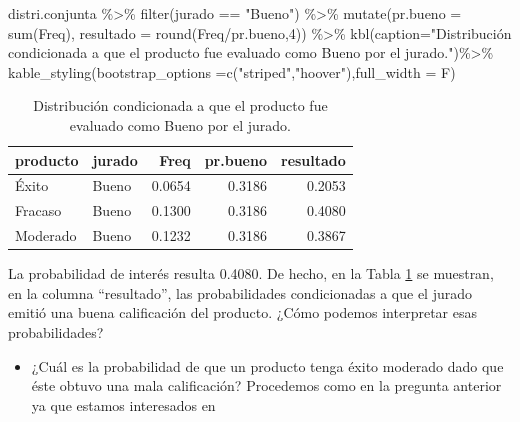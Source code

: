 \documentclass[
]{book}
\newenvironment{Shaded}{\begin{snugshade}}{\end{snugshade}}
\newcommand{\AttributeTok}[1]{\textcolor[rgb]{0.77,0.63,0.00}{#1}}
\newcommand{\DecValTok}[1]{\textcolor[rgb]{0.00,0.00,0.81}{#1}}
\newcommand{\FunctionTok}[1]{\textcolor[rgb]{0.00,0.00,0.00}{#1}}
\newcommand{\NormalTok}[1]{#1}
\newcommand{\SpecialCharTok}[1]{\textcolor[rgb]{0.00,0.00,0.00}{#1}}
\newcommand{\StringTok}[1]{\textcolor[rgb]{0.31,0.60,0.02}{#1}}
\providecommand{\tightlist}{%
  \setlength{\itemsep}{0pt}\setlength{\parskip}{0pt}}
\theoremstyle{definition}
\theoremstyle{definition}
\theoremstyle{definition}
\theoremstyle{definition}
\theoremstyle{remark}
\begin{document}
\begin{Shaded}
\begin{Highlighting}[]
\NormalTok{distri.conjunta }\SpecialCharTok{\%\textgreater{}\%} 
  \FunctionTok{filter}\NormalTok{(jurado }\SpecialCharTok{==} \StringTok{"Bueno"}\NormalTok{) }\SpecialCharTok{\%\textgreater{}\%}
  \FunctionTok{mutate}\NormalTok{(}\AttributeTok{pr.bueno =} \FunctionTok{sum}\NormalTok{(Freq), }\AttributeTok{resultado =} \FunctionTok{round}\NormalTok{(Freq}\SpecialCharTok{/}\NormalTok{pr.bueno,}\DecValTok{4}\NormalTok{)) }\SpecialCharTok{\%\textgreater{}\%}
  \FunctionTok{kbl}\NormalTok{(}\AttributeTok{caption=}\StringTok{"Distribución condicionada a que el producto fue evaluado como Bueno por el jurado."}\NormalTok{)}\SpecialCharTok{\%\textgreater{}\%}
      \FunctionTok{kable\_styling}\NormalTok{(}\AttributeTok{bootstrap\_options =}\FunctionTok{c}\NormalTok{(}\StringTok{"striped"}\NormalTok{,}\StringTok{"hoover"}\NormalTok{),}\AttributeTok{full\_width =}\NormalTok{ F)}
\end{Highlighting}
\end{Shaded}

\begin{table}

\caption{\label{tab:01-031}Distribución condicionada a que el producto fue evaluado como Bueno por el jurado.}
\centering
\begin{tabular}[t]{l|l|r|r|r}
\hline
producto & jurado & Freq & pr.bueno & resultado\\
\hline
Éxito & Bueno & 0.0654 & 0.3186 & 0.2053\\
\hline
Fracaso & Bueno & 0.1300 & 0.3186 & 0.4080\\
\hline
Moderado & Bueno & 0.1232 & 0.3186 & 0.3867\\
\hline
\end{tabular}
\end{table}

La probabilidad de interés resulta 0.4080. De hecho, en la Tabla \ref{tab:01-031} se muestran, en la columna ``resultado'', las probabilidades condicionadas a que el jurado emitió una buena calificación del producto. ¿Cómo podemos interpretar esas probabilidades?

\begin{itemize}
\tightlist
\item
  ¿Cuál es la probabilidad de que un producto tenga éxito moderado dado que éste obtuvo una mala calificación? Procedemos como en la pregunta anterior ya que estamos interesados en
\end{itemize}
\end{document}
